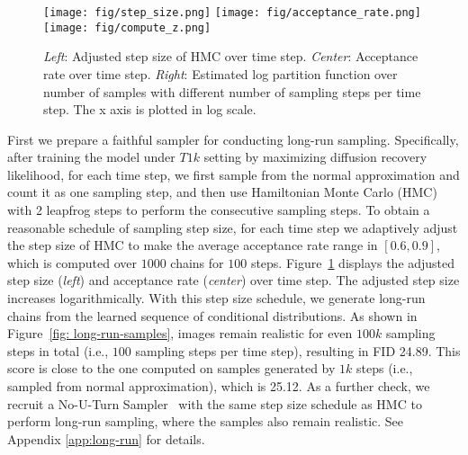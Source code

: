 \documentclass{article} \usepackage{iclr2021_conference,times}
\def\Figref#1{Figure~\ref{#1}}
\begin{document}
\begin{figure}[ht]
\begin{center}
\texttt{[image: fig/step\_size.png]}
\texttt{[image: fig/acceptance\_rate.png]}
\texttt{[image: fig/compute\_z.png]}
\end{center}
\caption{{\em Left}: Adjusted step size of HMC over time step. {\em Center}: Acceptance rate over time step. {\em Right}: Estimated log partition function over number of samples with different number of sampling steps per time step. The x axis is plotted in log scale.}
\vspace{-0.3cm}
\label{fig: long-run}
\end{figure}
First we prepare a faithful sampler for conducting long-run sampling. Specifically, after training the model under $T1k$ setting by maximizing diffusion recovery likelihood, for each time step, we first sample from the normal approximation and count it as one sampling step, and then use Hamiltonian Monte Carlo (HMC)~\citep{neal2011mcmc} with 2 leapfrog steps to perform the consecutive sampling steps. To obtain a reasonable schedule of sampling step size, for each time step we adaptively adjust the step size of HMC to make the average acceptance rate range in $[0.6, 0.9]$, which is computed over $1000$ chains for $100$ steps. \Figref{fig: long-run} displays the adjusted step size ({\em left}) and acceptance rate ({\em center}) over time step. The adjusted step size increases logarithmically. With this step size schedule, we generate long-run chains from the learned sequence of conditional distributions. As shown in \Figref{fig: long-run-samples}, images remain realistic for even $100k$ sampling steps in total (i.e., $100$ sampling steps per time step), resulting in FID 24.89. This score is close to the one computed on samples generated by $1k$ steps (i.e., sampled from normal approximation), which is 25.12. As a further check, we recruit a No-U-Turn Sampler~\citep{hoffman2014no} with the same step size schedule as HMC to perform long-run sampling, where the samples also remain realistic. See Appendix \ref{app:long-run} for details.
\end{document}
